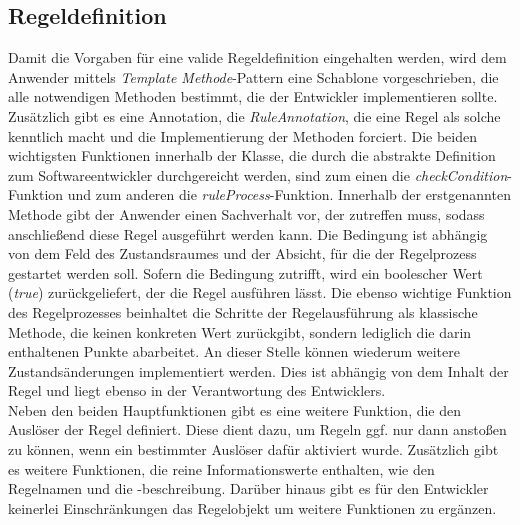 \subsection{Regeldefinition}
    Damit die Vorgaben für eine valide Regeldefinition eingehalten werden, wird dem Anwender mittels \textit{Template Methode}-Pattern 
    eine Schablone vorgeschrieben, die alle notwendigen Methoden bestimmt, die der Entwickler implementieren sollte. Zusätzlich gibt es eine Annotation, die 
    \textit{RuleAnnotation}, die eine Regel als solche kenntlich macht und die Implementierung der Methoden forciert. Die beiden wichtigsten Funktionen 
    innerhalb der Klasse, die durch die abstrakte Definition zum Softwareentwickler durchgereicht werden, sind zum einen die \textit{checkCondition}-Funktion und 
    zum anderen die \textit{ruleProcess}-Funktion. Innerhalb der erstgenannten Methode gibt der Anwender einen Sachverhalt vor, der zutreffen muss, sodass anschließend diese 
    Regel ausgeführt werden kann. Die Bedingung ist abhängig von dem Feld des Zustandsraumes und der Absicht, für die der Regelprozess gestartet werden soll. Sofern die 
    Bedingung zutrifft, wird ein boolescher Wert (\textit{true}) zurückgeliefert, der die Regel ausführen lässt. Die ebenso wichtige Funktion des Regelprozesses beinhaltet die Schritte der 
    Regelausführung als klassische Methode, die keinen konkreten Wert zurückgibt, sondern lediglich die darin enthaltenen Punkte abarbeitet. An dieser Stelle können wiederum 
    weitere Zustandsänderungen implementiert werden. Dies ist abhängig von dem Inhalt der Regel und liegt ebenso in der Verantwortung des Entwicklers. 
    \\
    Neben den beiden Hauptfunktionen gibt es eine weitere Funktion, die den Auslöser der Regel definiert. Diese dient dazu, um Regeln ggf. nur dann anstoßen zu können, wenn ein bestimmter 
    Auslöser dafür aktiviert wurde. Zusätzlich gibt es weitere Funktionen, die reine Informationswerte enthalten, wie den Regelnamen und die -beschreibung. Darüber hinaus gibt es für den 
    Entwickler keinerlei Einschränkungen das Regelobjekt um weitere Funktionen zu ergänzen. 

